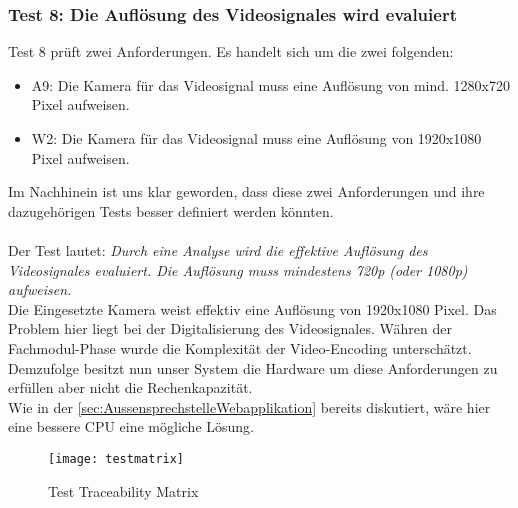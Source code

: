 \subsubsection{Test 8: Die Auflösung des Videosignales wird evaluiert}
Test 8 prüft zwei Anforderungen. Es handelt sich um die zwei folgenden:
\begin{itemize}
	\item A9: Die Kamera für das Videosignal muss eine Auflösung von mind. 1280x720 Pixel aufweisen. 
	\item W2: Die Kamera für das Videosignal muss eine Auflösung von 1920x1080 Pixel aufweisen. 
\end{itemize}
Im Nachhinein ist uns klar geworden, dass diese zwei Anforderungen und ihre dazugehörigen Tests besser definiert werden könnten. 
\\
\\
Der Test lautet: \textit{ Durch eine Analyse wird die effektive Auflösung des Videosignales evaluiert. Die Auflösung muss mindestens 720p (oder 1080p) aufweisen.}
\\
Die Eingesetzte Kamera weist effektiv eine Auflösung von 1920x1080 Pixel. Das Problem hier liegt bei der Digitalisierung des Videosignales. Währen der Fachmodul-Phase wurde die Komplexität der Video-Encoding unterschätzt.
\\
Demzufolge besitzt nun unser System die Hardware um diese Anforderungen zu erfüllen aber nicht die Rechenkapazität.
\\
Wie in der \cref{sec:AussensprechstelleWebapplikation} bereits diskutiert, wäre hier eine bessere CPU eine mögliche Lösung.
\begin{figure}[htb!]
	\begin{center}
		\texttt{[image: testmatrix]}
		\caption[Test-Traceability Matrix]{Test Traceability Matrix}
		\label{fig:testmatrix}
	\end{center}
\end{figure}

\newpage